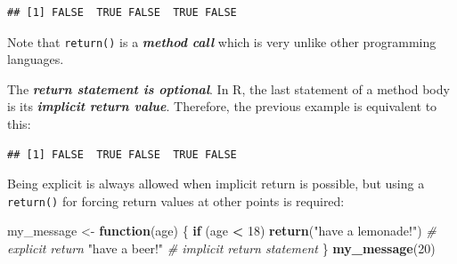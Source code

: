 \documentclass[]{book}
\newenvironment{Shaded}{\begin{snugshade}}{\end{snugshade}}
\newcommand{\CommentTok}[1]{\textcolor[rgb]{0.56,0.35,0.01}{\textit{#1}}}
\newcommand{\ControlFlowTok}[1]{\textcolor[rgb]{0.13,0.29,0.53}{\textbf{#1}}}
\newcommand{\DecValTok}[1]{\textcolor[rgb]{0.00,0.00,0.81}{#1}}
\newcommand{\KeywordTok}[1]{\textcolor[rgb]{0.13,0.29,0.53}{\textbf{#1}}}
\newcommand{\NormalTok}[1]{#1}
\newcommand{\OperatorTok}[1]{\textcolor[rgb]{0.81,0.36,0.00}{\textbf{#1}}}
\newcommand{\StringTok}[1]{\textcolor[rgb]{0.31,0.60,0.02}{#1}}
\begin{document}
\begin{Shaded}
\end{Shaded}

\begin{verbatim}
## [1] FALSE  TRUE FALSE  TRUE FALSE
\end{verbatim}

Note that \texttt{return()} is a \textbf{\emph{method call}} which is very unlike other programming languages.

The \textbf{\emph{return statement is optional}}.
In R, the last statement of a method body is its \textbf{\emph{implicit return value}}. Therefore, the previous example is equivalent to this:

\begin{Shaded}
\end{Shaded}

\begin{verbatim}
## [1] FALSE  TRUE FALSE  TRUE FALSE
\end{verbatim}

Being explicit is always allowed when implicit return is possible, but using a \texttt{return()} for forcing return values at other points is required:

\begin{Shaded}
\begin{Highlighting}[]
\NormalTok{my_message <-}\StringTok{ }\ControlFlowTok{function}\NormalTok{(age) \{}
    \ControlFlowTok{if}\NormalTok{ (age }\OperatorTok{<}\StringTok{ }\DecValTok{18}\NormalTok{) }\KeywordTok{return}\NormalTok{(}\StringTok{"have a lemonade!"}\NormalTok{) }\CommentTok{# explicit return}
    \StringTok{"have a beer!"} \CommentTok{# implicit return statement}
\NormalTok{\}}
\KeywordTok{my_message}\NormalTok{(}\DecValTok{20}\NormalTok{)}
\end{Highlighting}
\end{Shaded}
\end{document}
